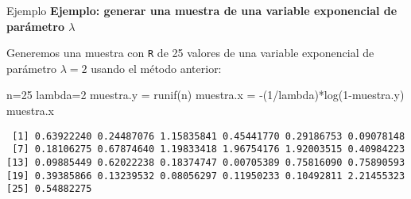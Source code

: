 \documentclass[
  ignorenonframetext,
  aspectratio=169]{beamer}
\newenvironment{Shaded}{\begin{snugshade}}{\end{snugshade}}
\newcommand{\DecValTok}[1]{\textcolor[rgb]{0.00,0.00,0.81}{#1}}
\newcommand{\FunctionTok}[1]{\textcolor[rgb]{0.00,0.00,0.00}{#1}}
\newcommand{\NormalTok}[1]{#1}
\newcommand{\OtherTok}[1]{\textcolor[rgb]{0.56,0.35,0.01}{#1}}
\newcommand{\SpecialCharTok}[1]{\textcolor[rgb]{0.00,0.00,0.00}{#1}}
\begin{document}
\begin{frame}[fragile]{Ejemplo}
\protect\hypertarget{ejemplo-5}{}
\textbf{Ejemplo: generar una muestra de una variable exponencial de
parámetro \(\lambda\)}

Generemos una muestra con \texttt{R} de 25 valores de una variable
exponencial de parámetro \(\lambda=2\) usando el método anterior:

\begin{Shaded}
\begin{Highlighting}[]
\NormalTok{n}\OtherTok{=}\DecValTok{25}
\NormalTok{lambda}\OtherTok{=}\DecValTok{2}
\NormalTok{muestra.y }\OtherTok{=} \FunctionTok{runif}\NormalTok{(n)}
\NormalTok{muestra.x }\OtherTok{=} \SpecialCharTok{{-}}\NormalTok{(}\DecValTok{1}\SpecialCharTok{/}\NormalTok{lambda)}\SpecialCharTok{*}\FunctionTok{log}\NormalTok{(}\DecValTok{1}\SpecialCharTok{{-}}\NormalTok{muestra.y)}
\NormalTok{muestra.x}
\end{Highlighting}
\end{Shaded}

\begin{verbatim}
 [1] 0.63922240 0.24487076 1.15835841 0.45441770 0.29186753 0.09078148
 [7] 0.18106275 0.67874640 1.19833418 1.96754176 1.92003515 0.40984223
[13] 0.09885449 0.62022238 0.18374747 0.00705389 0.75816090 0.75890593
[19] 0.39385866 0.13239532 0.08056297 0.11950233 0.10492811 2.21455323
[25] 0.54882275
\end{verbatim}
\end{frame}
\end{document}
